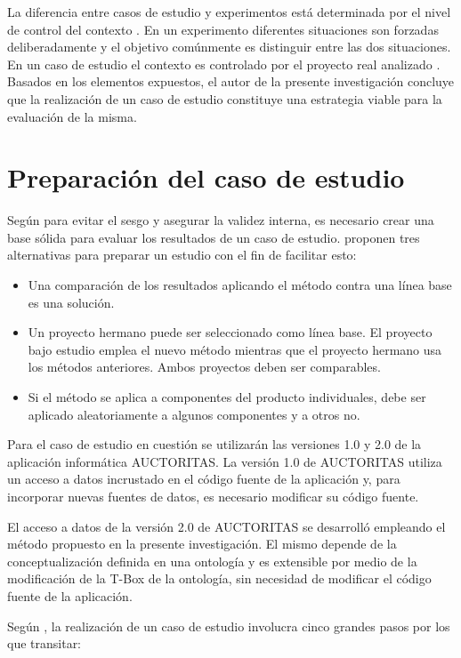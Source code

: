 La diferencia entre casos de estudio y experimentos está determinada por el nivel de control del contexto \citep{Petersen:2009:CIS:1671248.1671293}. En un experimento diferentes situaciones son forzadas deliberadamente y el objetivo comúnmente es distinguir entre las dos situaciones. En un caso de estudio el contexto es controlado por el proyecto real analizado \citep{Wohlin2012}. Basados en los elementos expuestos, el autor de la presente investigación concluye que la realización de un caso de estudio constituye una estrategia viable para la evaluación de la misma. 

\section{Preparación del caso de estudio}
Según \cite{kitchenham1995case} para evitar el sesgo y asegurar la validez interna, es necesario crear una base sólida para evaluar los resultados de un caso de estudio. \cite{kitchenham1995case} proponen tres alternativas para preparar un estudio con el fin de facilitar esto:

\begin{itemize}
\item Una comparación de los resultados aplicando el método contra una línea base es una solución.
\item Un proyecto hermano puede ser seleccionado como línea base. El proyecto bajo estudio emplea el nuevo método mientras que el proyecto hermano usa los métodos anteriores. Ambos proyectos deben ser comparables.
\item Si el método se aplica a componentes del producto individuales, debe ser aplicado aleatoriamente a algunos componentes y a otros no.
\end{itemize}

Para el caso de estudio en cuestión se utilizarán las versiones 1.0 y 2.0 de la aplicación informática AUCTORITAS. La versión 1.0 de AUCTORITAS utiliza un acceso a datos incrustado en el código fuente de la aplicación y, para incorporar nuevas fuentes de datos, es necesario modificar su código fuente.

El acceso a datos de la versión 2.0 de AUCTORITAS se desarrolló empleando el método propuesto en la presente investigación. El mismo depende de la conceptualización definida en una ontología y es extensible por medio de la modificación de la T-Box de la ontología, sin necesidad de modificar el código fuente de la aplicación.

Según \cite{Wohlin2012}, la realización de un caso de estudio involucra cinco grandes pasos por los que transitar:

